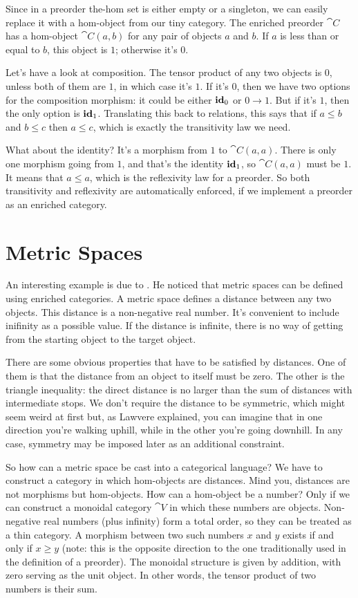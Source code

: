 Since in a preorder the-hom set is either empty or a singleton, we can
easily replace it with a hom-object from our tiny category. The enriched
preorder $\cat{C}$ has a hom-object $\cat{C}(a, b)$ for any pair of
objects $a$ and $b$. If $a$ is less than or equal
to $b$, this object is $1$; otherwise it's $0$.

Let's have a look at composition. The tensor product of any two objects
is $0$, unless both of them are $1$, in which case it's $1$. If it's $0$, then
we have two options for the composition morphism: it could be either
$\idarrow[0]$ or $0 \to 1$. But if it's $1$, then the only
option is $\idarrow[1]$. Translating this back to relations, this says
that if $a \leqslant b$ and $b \leqslant c$ then
$a \leqslant c$, which is exactly the transitivity law we
need.

What about the identity? It's a morphism from $1$ to $\cat{C}(a, a)$.
There is only one morphism going from $1$, and that's the identity
$\idarrow[1]$, so $\cat{C}(a, a)$ must be $1$. It means that
$a \leqslant a$, which is the reflexivity law for a
preorder. So both transitivity and reflexivity are automatically
enforced, if we implement a preorder as an enriched category.

\section{Metric Spaces}

An interesting example is due to
. He noticed that metric spaces can be defined using enriched
categories. A metric space defines a distance between any two objects.
This distance is a non-negative real number. It's convenient to include
inifinity as a possible value. If the distance is infinite, there is no
way of getting from the starting object to the target object.

There are some obvious properties that have to be satisfied by
distances. One of them is that the distance from an object to itself
must be zero. The other is the triangle inequality: the direct distance
is no larger than the sum of distances with intermediate stops. We don't
require the distance to be symmetric, which might seem weird at first
but, as Lawvere explained, you can imagine that in one direction you're
walking uphill, while in the other you're going downhill. In any case,
symmetry may be imposed later as an additional constraint.

So how can a metric space be cast into a categorical language? We have
to construct a category in which hom-objects are distances. Mind you,
distances are not morphisms but hom-objects. How can a hom-object be a
number? Only if we can construct a monoidal category $\cat{V}$ in which
these numbers are objects. Non-negative real numbers (plus infinity)
form a total order, so they can be treated as a thin category. A
morphism between two such numbers $x$ and $y$ exists if
and only if $x \geqslant y$ (note: this is the opposite
direction to the one traditionally used in the definition of a
preorder). The monoidal structure is given by addition, with zero
serving as the unit object. In other words, the tensor product of two
numbers is their sum.

